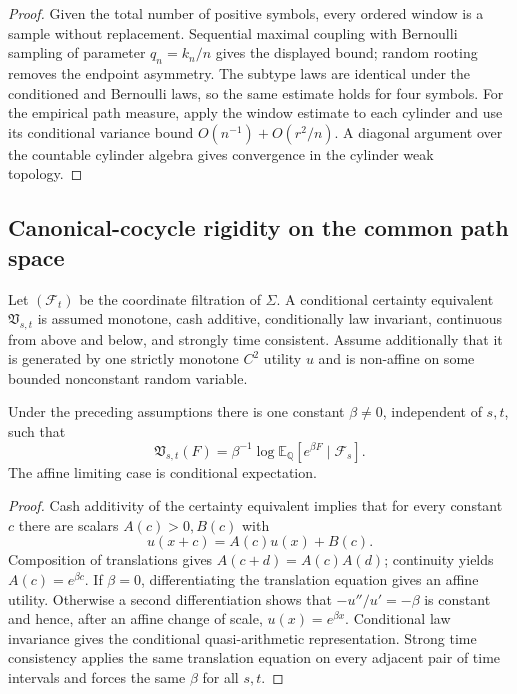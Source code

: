 \begin{proof}
Given the total number of positive symbols, every ordered window is a sample
without replacement.  Sequential maximal coupling with Bernoulli sampling of
parameter \(q_n=k_n/n\) gives the displayed bound; random rooting removes the
endpoint asymmetry.  The subtype laws are identical under the conditioned and
Bernoulli laws, so the same estimate holds for four symbols.  For the
empirical path measure, apply the window estimate to each cylinder and use
its conditional variance bound \(O(n^{-1})+O(r^2/n)\).  A diagonal argument
over the countable cylinder algebra gives convergence in the cylinder weak
topology.
\end{proof}

\subsection{Canonical-cocycle rigidity on the common path space}

Let \((\mathcal F_t)\) be the coordinate filtration of \(\Sigma\).  A
conditional certainty equivalent \(\mathfrak V_{s,t}\) is assumed monotone,
cash additive, conditionally law invariant, continuous from above and below,
and strongly time consistent.  Assume additionally that it is generated by
one strictly monotone \(C^2\) utility \(u\) and is non-affine on some bounded
nonconstant random variable.

\begin{lemma}
\label{lem:r4-a1-kn}
Under the preceding assumptions there is one constant \(\beta\ne0\),
independent of \(s,t\), such that
\[
 \mathfrak V_{s,t}(F)
 =\beta^{-1}\log
 \mathbb E_{\mathbb Q}[e^{\beta F}\mid\mathcal F_s].
\]
The affine limiting case is conditional expectation.
\end{lemma}

\begin{proof}
Cash additivity of the certainty equivalent implies that for every constant
\(c\) there are scalars \(A(c)>0,B(c)\) with
\[
 u(x+c)=A(c)u(x)+B(c).
\]
Composition of translations gives
\(A(c+d)=A(c)A(d)\); continuity yields \(A(c)=e^{\beta c}\).  If
\(\beta=0\), differentiating the translation equation gives an affine
utility.  Otherwise a second differentiation shows that
\(-u''/u'= -\beta\) is constant and hence, after an affine change of scale,
\(u(x)=e^{\beta x}\).  Conditional law invariance gives the conditional
quasi-arithmetic representation.  Strong time consistency applies the same
translation equation on every adjacent pair of time intervals and forces the
same \(\beta\) for all \(s,t\).
\end{proof}

